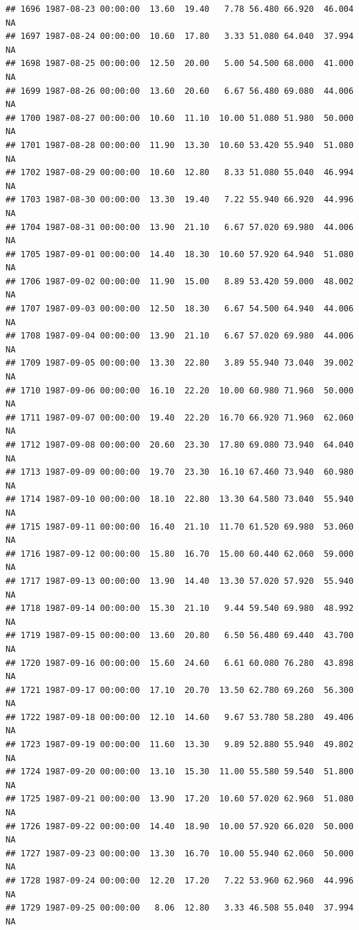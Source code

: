 \documentclass{article}\usepackage{graphicx, color}
\makeatletter
\newenvironment{kframe}{%
 \def\at@end@of@kframe{}%
 \ifinner\ifhmode%
  \def\at@end@of@kframe{\end{minipage}}%
  \begin{minipage}{\columnwidth}%
 \fi\fi%
 \def\FrameCommand##1{\hskip\@totalleftmargin \hskip-\fboxsep
 \colorbox{shadecolor}{##1}\hskip-\fboxsep
     \hskip-\linewidth \hskip-\@totalleftmargin \hskip\columnwidth}%
 \MakeFramed {\advance\hsize-\width
   \@totalleftmargin\z@ \linewidth\hsize
   \@setminipage}}%
 {\par\unskip\endMakeFramed%
 \at@end@of@kframe}
\newenvironment{knitrout}{}{} %
\makeatother
\begin{document}
\begin{knitrout}
\begin{kframe}
\begin{verbatim}
## 1696 1987-08-23 00:00:00  13.60  19.40   7.78 56.480 66.920  46.004     NA
## 1697 1987-08-24 00:00:00  10.60  17.80   3.33 51.080 64.040  37.994     NA
## 1698 1987-08-25 00:00:00  12.50  20.00   5.00 54.500 68.000  41.000     NA
## 1699 1987-08-26 00:00:00  13.60  20.60   6.67 56.480 69.080  44.006     NA
## 1700 1987-08-27 00:00:00  10.60  11.10  10.00 51.080 51.980  50.000     NA
## 1701 1987-08-28 00:00:00  11.90  13.30  10.60 53.420 55.940  51.080     NA
## 1702 1987-08-29 00:00:00  10.60  12.80   8.33 51.080 55.040  46.994     NA
## 1703 1987-08-30 00:00:00  13.30  19.40   7.22 55.940 66.920  44.996     NA
## 1704 1987-08-31 00:00:00  13.90  21.10   6.67 57.020 69.980  44.006     NA
## 1705 1987-09-01 00:00:00  14.40  18.30  10.60 57.920 64.940  51.080     NA
## 1706 1987-09-02 00:00:00  11.90  15.00   8.89 53.420 59.000  48.002     NA
## 1707 1987-09-03 00:00:00  12.50  18.30   6.67 54.500 64.940  44.006     NA
## 1708 1987-09-04 00:00:00  13.90  21.10   6.67 57.020 69.980  44.006     NA
## 1709 1987-09-05 00:00:00  13.30  22.80   3.89 55.940 73.040  39.002     NA
## 1710 1987-09-06 00:00:00  16.10  22.20  10.00 60.980 71.960  50.000     NA
## 1711 1987-09-07 00:00:00  19.40  22.20  16.70 66.920 71.960  62.060     NA
## 1712 1987-09-08 00:00:00  20.60  23.30  17.80 69.080 73.940  64.040     NA
## 1713 1987-09-09 00:00:00  19.70  23.30  16.10 67.460 73.940  60.980     NA
## 1714 1987-09-10 00:00:00  18.10  22.80  13.30 64.580 73.040  55.940     NA
## 1715 1987-09-11 00:00:00  16.40  21.10  11.70 61.520 69.980  53.060     NA
## 1716 1987-09-12 00:00:00  15.80  16.70  15.00 60.440 62.060  59.000     NA
## 1717 1987-09-13 00:00:00  13.90  14.40  13.30 57.020 57.920  55.940     NA
## 1718 1987-09-14 00:00:00  15.30  21.10   9.44 59.540 69.980  48.992     NA
## 1719 1987-09-15 00:00:00  13.60  20.80   6.50 56.480 69.440  43.700     NA
## 1720 1987-09-16 00:00:00  15.60  24.60   6.61 60.080 76.280  43.898     NA
## 1721 1987-09-17 00:00:00  17.10  20.70  13.50 62.780 69.260  56.300     NA
## 1722 1987-09-18 00:00:00  12.10  14.60   9.67 53.780 58.280  49.406     NA
## 1723 1987-09-19 00:00:00  11.60  13.30   9.89 52.880 55.940  49.802     NA
## 1724 1987-09-20 00:00:00  13.10  15.30  11.00 55.580 59.540  51.800     NA
## 1725 1987-09-21 00:00:00  13.90  17.20  10.60 57.020 62.960  51.080     NA
## 1726 1987-09-22 00:00:00  14.40  18.90  10.00 57.920 66.020  50.000     NA
## 1727 1987-09-23 00:00:00  13.30  16.70  10.00 55.940 62.060  50.000     NA
## 1728 1987-09-24 00:00:00  12.20  17.20   7.22 53.960 62.960  44.996     NA
## 1729 1987-09-25 00:00:00   8.06  12.80   3.33 46.508 55.040  37.994     NA

\end{verbatim}
\end{kframe}
\end{knitrout}
\end{document}
